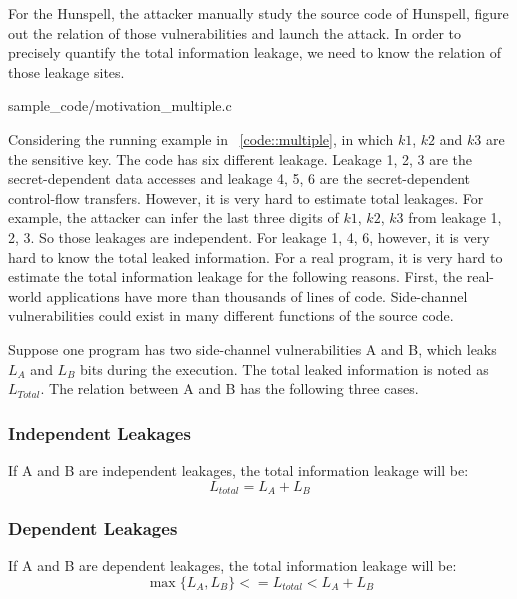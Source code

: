 For the Hunspell, the attacker manually study the source code of Hunspell, figure out
the relation of those vulnerabilities and launch the attack. In order to precisely quantify the
total information leakage, we need to know the relation of those leakage sites. 


                 {sample_code/motivation_multiple.c}

Considering the running example in ~\ref{code::multiple}, in which $k1$, $k2$ and $k3$ are
the sensitive key. The code has six different leakage. Leakage 1, 2, 3 are the secret-dependent
data accesses and leakage 4, 5, 6 are the secret-dependent control-flow transfers. However, it is
very hard to estimate total leakages. For example, the attacker can infer the last three digits of
$k1$, $k2$, $k3$ from leakage 1, 2, 3. So those leakages are independent. For leakage 1, 4, 6, however,
it is very hard to know the total leaked information. 
For a real program, it is very hard to estimate the total information leakage for the following reasons.
First, the real-world applications have more than thousands of lines of code. Side-channel vulnerabilities
could exist in many different functions of the source code. 

Suppose one program has two side-channel vulnerabilities A and B, which leaks $L_A$ and $L_B$ bits
during the execution. The total leaked information is noted as $L_{Total}$. The relation between
A and B has the following three cases. 

\subsubsection{Independent Leakages}
If A and B are independent leakages, the total information leakage will be:
\begin{equation}
\label{independent leakage}
    L_{total} = L_A + L_B \nonumber
\end{equation} 

\subsubsection{Dependent Leakages}
If A and B are dependent leakages, the total information leakage will be:
\begin{equation}
\label{dependent leakage}
    \max{\{L_A, L_B\}}  <= L_{total} < L_A + L_B \nonumber
\end{equation}


